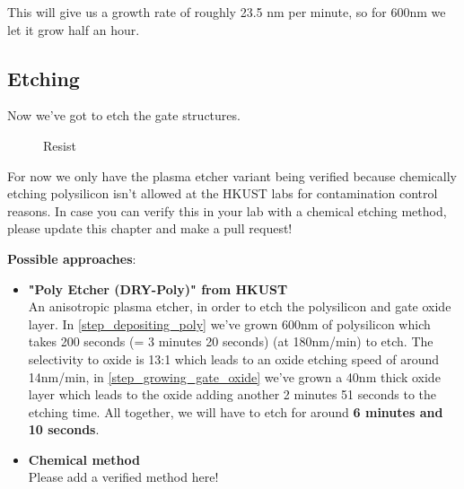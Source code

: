 This will give us a growth rate of roughly 23.5 nm per minute, so for 600nm we let it grow half an hour.

\newpage

\subsection{Etching}

Now we've got to etch the gate structures.

\begin{figure}[H]
	\centering
	\begin{tikzpicture}[node distance = 3cm, auto, thick,scale=\CrossAndTopSection, every node/.style={transform shape}]
		
	\end{tikzpicture}
	\begin{tikzpicture}[node distance = 3cm, auto, thick,scale=\CrossAndTopSection, every node/.style={transform shape}]
		
	\end{tikzpicture}
	\drawStepArrow{}
	\begin{tikzpicture}[node distance = 3cm, auto, thick,scale=\CrossAndTopSection, every node/.style={transform shape}]
		
	\end{tikzpicture}
	\begin{tikzpicture}[node distance = 3cm, auto, thick,scale=\CrossAndTopSection, every node/.style={transform shape}]
		
	\end{tikzpicture}
	\caption{Resist}
\end{figure}

\begin{mdframed}[linewidth=2pt,linecolor=red]
For now we only have the plasma etcher variant being verified because chemically etching polysilicon isn't allowed at the HKUST labs for contamination control reasons.
In case you can verify this in your lab with a chemical etching method, please update this chapter and make a pull request!
\end{mdframed}

\textbf{Possible approaches}:
\begin{itemize}
	\item \textbf{"Poly Etcher (DRY-Poly)" from HKUST} \\
	An anisotropic plasma etcher, in order to etch the polysilicon and gate oxide layer.
	In \autoref{step_depositing_poly} we've grown 600nm of polysilicon which takes 200 seconds (= 3 minutes 20 seconds) (at 180nm/min) to etch.
	The selectivity to oxide is 13:1 which leads to an oxide etching speed of around 14nm/min, in \autoref{step_growing_gate_oxide} we've grown a 40nm thick oxide layer which leads to the oxide adding another 2 minutes 51 seconds to the etching time.
	All together, we will have to etch for around \textbf{6 minutes and 10 seconds}.
	\item \textbf{Chemical method} \\
	Please add a verified method here!
\end{itemize}
